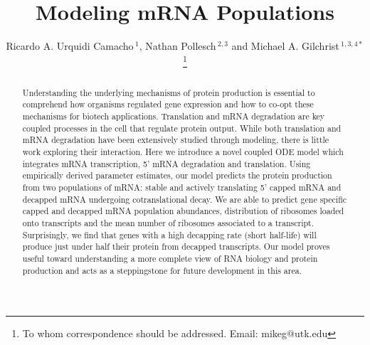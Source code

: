 \documentclass[a4,center,fleqn]{NAR}
\begin{document}
\title{Modeling mRNA Populations}
\author{%
Ricardo A. Urquidi Camacho\,$^{1}$,
Nathan Pollesch\,$^{2, 3}$
and Michael A. Gilchrist\,$^{1, 3, 4*}$%
\footnote{To whom correspondence should be addressed.
Email: mikeg@utk.edu}}

\address{%
$^{1}$Genome Science and Technology Program, University of Tennessee, Knoxville, TN 37996, USA\,
$^{2}$Department of Mathematics, University of Tennessee,  Knoxville, TN 37996, USA\,
$^{3}$Department of Ecology and Evolutionary Biology, University of Tennessee, Knoxville, TN 37996, USA\,
and
$^{4}$National Institute for Mathematical and Biological Synthesis, University of Tennessee, Knoxville, TN 37996, USA}



\maketitle
\begin{abstract}
Understanding the underlying mechanisms of protein production is essential to comprehend how organisms regulated gene expression and how to co-opt these mechanisms for biotech applications. Translation and mRNA degradation are key coupled processes in the cell that regulate protein output. While both translation and mRNA degradation have been extensively studied through modeling, there is little work exploring their interaction. Here we introduce a novel coupled ODE model which integrates mRNA transcription, 5' mRNA degradation and translation. Using empirically derived parameter estimates, our model predicts the protein production from two populations of mRNA: stable and actively translating 5' capped mRNA and decapped mRNA undergoing cotranslational decay. We are able to predict gene specific capped and decapped mRNA population abundances, distribution of ribosomes loaded onto transcripts and the mean number of ribosomes associated to a transcript. Surprisingly, we find that genes with a high decapping rate (short half-life) will produce just under half their protein from decapped transcripts. Our model proves useful toward understanding a more complete view of RNA biology and protein production and acts as a steppingstone for future development in this area. 
 
\end{abstract}
\end{document}
